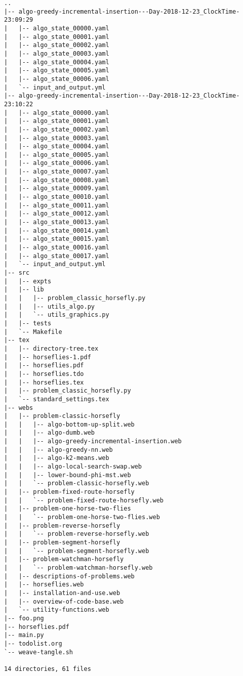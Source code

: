 \begin{verbatim}
..
|-- algo-greedy-incremental-insertion---Day-2018-12-23_ClockTime-23:09:29
|   |-- algo_state_00000.yaml
|   |-- algo_state_00001.yaml
|   |-- algo_state_00002.yaml
|   |-- algo_state_00003.yaml
|   |-- algo_state_00004.yaml
|   |-- algo_state_00005.yaml
|   |-- algo_state_00006.yaml
|   `-- input_and_output.yml
|-- algo-greedy-incremental-insertion---Day-2018-12-23_ClockTime-23:10:22
|   |-- algo_state_00000.yaml
|   |-- algo_state_00001.yaml
|   |-- algo_state_00002.yaml
|   |-- algo_state_00003.yaml
|   |-- algo_state_00004.yaml
|   |-- algo_state_00005.yaml
|   |-- algo_state_00006.yaml
|   |-- algo_state_00007.yaml
|   |-- algo_state_00008.yaml
|   |-- algo_state_00009.yaml
|   |-- algo_state_00010.yaml
|   |-- algo_state_00011.yaml
|   |-- algo_state_00012.yaml
|   |-- algo_state_00013.yaml
|   |-- algo_state_00014.yaml
|   |-- algo_state_00015.yaml
|   |-- algo_state_00016.yaml
|   |-- algo_state_00017.yaml
|   `-- input_and_output.yml
|-- src
|   |-- expts
|   |-- lib
|   |   |-- problem_classic_horsefly.py
|   |   |-- utils_algo.py
|   |   `-- utils_graphics.py
|   |-- tests
|   `-- Makefile
|-- tex
|   |-- directory-tree.tex
|   |-- horseflies-1.pdf
|   |-- horseflies.pdf
|   |-- horseflies.tdo
|   |-- horseflies.tex
|   |-- problem_classic_horsefly.py
|   `-- standard_settings.tex
|-- webs
|   |-- problem-classic-horsefly
|   |   |-- algo-bottom-up-split.web
|   |   |-- algo-dumb.web
|   |   |-- algo-greedy-incremental-insertion.web
|   |   |-- algo-greedy-nn.web
|   |   |-- algo-k2-means.web
|   |   |-- algo-local-search-swap.web
|   |   |-- lower-bound-phi-mst.web
|   |   `-- problem-classic-horsefly.web
|   |-- problem-fixed-route-horsefly
|   |   `-- problem-fixed-route-horsefly.web
|   |-- problem-one-horse-two-flies
|   |   `-- problem-one-horse-two-flies.web
|   |-- problem-reverse-horsefly
|   |   `-- problem-reverse-horsefly.web
|   |-- problem-segment-horsefly
|   |   `-- problem-segment-horsefly.web
|   |-- problem-watchman-horsefly
|   |   `-- problem-watchman-horsefly.web
|   |-- descriptions-of-problems.web
|   |-- horseflies.web
|   |-- installation-and-use.web
|   |-- overview-of-code-base.web
|   `-- utility-functions.web
|-- foo.png
|-- horseflies.pdf
|-- main.py
|-- todolist.org
`-- weave-tangle.sh

14 directories, 61 files
\end{verbatim}
